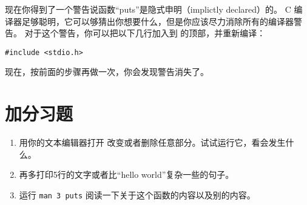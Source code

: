 现在你得到了一个警告说函数“puts”是隐式申明（implictly declared）的。
C 编译器足够聪明，它可以够猜出你想要什么，但是你应该尽力消除所有的编译器警告。
对于这个警告，你可以把以下几行加入到  的顶部，并重新编译：

\begin{lstlisting}
#include <stdio.h>
\end{lstlisting}

现在，按前面的步骤再做一次，你会发现警告消失了。

\section{加分习题}

\begin{enumerate}
\item 用你的文本编辑器打开  改变或者删除任意部分。试试运行它，看会发生什么。
\item 再多打印5行的文字或者比“hello world”复杂一些的句子。
\item 运行 \verb|man 3 puts| 阅读一下关于这个函数的内容以及别的内容。
\end{enumerate}



